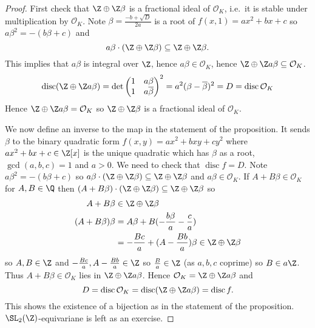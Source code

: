 \documentclass[a4paper]{article}
\renewcommand*{\O}{\mathcal{O}}
\DeclareMathOperator{\disc}{disc} %
\begin{document}
\begin{proof}
  First check that \(\Z \oplus \Z \beta\) is a fractional ideal of \(\O_K\), i.e.\ it is stable under multiplication by \(\O_K\). Note \(\beta = \frac{-b + \sqrt D}{2a}\) is a root of \(f(x, 1) = ax^2 + bx + c\) so \(a\beta^2 = -(b \beta + c)\) and
  \[
    a \beta \cdot (\Z \oplus \Z \beta) \subseteq \Z \oplus \Z \beta.
  \]
  This implies that \(a\beta\) is integral over \(\Z\), hence \(a \beta \in \O_K\), hence \(\Z \oplus \Z a \beta \subseteq \O_K\).
  \[
    \disc (\Z \oplus \Z a \beta) = \det
    \begin{pmatrix}
      1 & a \beta \\
      1 & a \overline \beta
    \end{pmatrix}
    ^2 = a^2 (\beta - \overline \beta)^2 = D = \disc \O_K
  \]
  Hence \(\Z \oplus \Z a\beta = \O_K\) so \(\Z \oplus \Z \beta\) is a fractional ideal of \(\O_K\).

  We now define an inverse to the map in the statement of the proposition. It sends \(\beta\) to the binary quadratic form \(f(x, y) = ax^2 + bxy + cy^2\) where \(ax^2 + bx + c \in \Z[x]\) is the unique quadratic which has \(\beta\) as a root, \(\gcd(a, b, c) = 1\) and \(a > 0\). We need to check that \(\disc f = D\). Note \(a \beta^2 = -(b \beta + c)\) so \(a\beta \cdot (\Z \oplus \Z \beta) \subseteq \Z \oplus \Z \beta\) and \(a\beta \in \O_K\). If \(A + B \beta \in \O_K\) for \(A, B \in \Q\) then \((A + B \beta) \cdot (\Z \oplus \Z \beta) \subseteq \Z \oplus \Z \beta\) so
  \begin{align*}
    A + B \beta &\in \Z \oplus \Z \beta \\
    (A + B \beta) \beta &= A\beta + B(- \frac{b \beta}{a} - \frac{c}{a}) \\
                &= - \frac{Bc}{a} + (A - \frac{Bb}{a}) \beta \in \Z \oplus \Z \beta
  \end{align*}
  so \(A, B \in \Z\) and \(- \frac{Bc}{a}, A - \frac{Bb}{a} \in \Z\) so \(\frac{B}{a} \in \Z\) (as \(a, b, c\) coprime) so \(B \in a \Z\). Thus \(A + B \beta \in \O_K\) lies in \(\Z \oplus \Z a\beta\). Hence \(\O_K = \Z \oplus \Z a \beta\) and
  \[
    D = \disc \O_K = \disc (\Z \oplus \Z a \beta) = \disc f.
  \]
  This shows the existence of a bijection as in the statement of the proposition. \(\SL_2(\Z)\)-equivariane is left as an exercise.
\end{proof}
\end{document}
